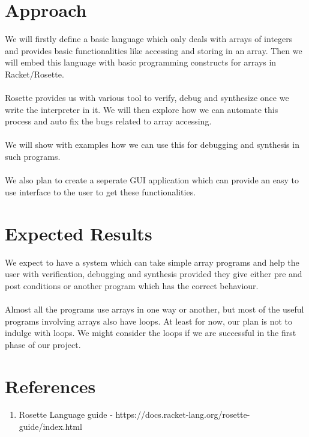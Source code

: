 \documentclass[a4paper, 12pt, notitlepage] {article}
\begin{document}
\section {Approach}
We will firstly define a basic language which only deals with arrays of integers and provides basic functionalities like accessing and storing in an array. Then we will embed this language with basic programming constructs for arrays in Racket/Rosette.\\
\\
Rosette provides us with various tool to verify, debug and synthesize once we write the interpreter in it. We will then explore how we can automate this process and auto fix the bugs related to array accessing.
\\
\\
We will show with examples how we can use this for debugging and synthesis in such programs.\\
\\
We also plan to create a seperate GUI application which can provide an easy to use interface to the user to get these functionalities. 


\section{Expected Results}
We expect to have a system which can take simple array programs and help the user with verification, debugging and synthesis provided they give either pre and post conditions or another program which has the correct behaviour.\\
\\
Almost all the programs use arrays in one way or another, but most of the useful programs involving arrays also have loops. At least for now, our plan is not to indulge with loops. We might consider the loops if we are successful in the first phase of our project. 

\section*{References}

\begin{enumerate}
	\item Rosette Language guide - https://docs.racket-lang.org/rosette-guide/index.html
\end{enumerate}
\end{document}
